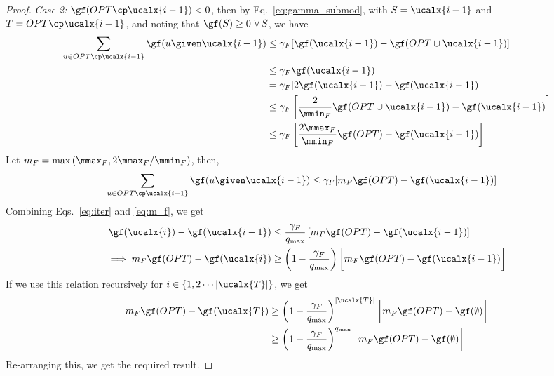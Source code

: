 \begin{proof}
\emph{Case 2:} $\gf(OPT\cp \ucalx{i-1}) < 0$, then by Eq.~\eqref{eq:gamma_submod}, with $S=\ucalx{i-1}$ and $T = OPT\cp \ucalx{i-1}$, and noting that $\gf(S)\ge 0\ \forall\,  S$, we have
\begin{align}
    \sum_{u\in OPT\cp \ucalx{i-1}} \gf(u\given    \ucalx{i-1}) &\le \gamma_F[\gf(\ucalx{i-1}) - \gf(OPT \cup \ucalx{i-1})] \\
                                                    &\le \gamma_F \gf(\ucalx{i-1})\\
                                                    &= \gamma_F [2\gf(\ucalx{i-1}) - \gf(\ucalx{i-1})]\\
                                                    &\le \gamma_F \left[ \frac{2}{\mmin_F} \gf(OPT \cup \ucalx{i-1}) - \gf(\ucalx{i-1})\right]\\
                                                    &\le \gamma_F \left[ \frac{2\mmax_F}{\mmin_F} \gf(OPT) - \gf(\ucalx{i-1})\right]
\end{align}
Let $m_F=\max\left(\mmax_F, 2\mmax_F/\mmin_F \right)$, then,
\begin{align}
    \sum_{u\in OPT\cp \ucalx{i-1}} \gf(u\given    \ucalx{i-1}) &\le \gamma_F[m_F \gf(OPT) - \gf(\ucalx{i-1})]
    \label{eq:m_f}
\end{align}
Combining Eqs.~\eqref{eq:iter} and \eqref{eq:m_f}, we get
\begin{align}
    \gf(\ucalx{i}) - \gf(\ucalx{i-1}) &\le \frac{\gamma_F}{q_{\max}} \left[ m_F \gf(OPT) - \gf(\ucalx{i-1})\right]\\
    \implies  m_F \gf(OPT) - \gf(\ucalx{i}) &\ge \left( 1 - \frac{\gamma_F}{q_{\max}} \right) \bigg[m_F \gf(OPT) - \gf(\ucalx{i-1})\bigg]
\end{align}
If we use this relation recursively for $  i \in \{1,2 \cdots | \ucalx{T}|\}$, we get
\begin{align}
    m_F \gf(OPT) - \gf( \ucalx{T}) &\ge \left( 1 - \frac{\gamma_F}{q_{\max}} \right)^{| \ucalx{T}|} \bigg[m_F \gf(OPT) - \gf(\emptyset)\bigg]\\
    &\ge \left( 1 - \frac{\gamma_F}{q_{\max}} \right)^{q_{\max}} \bigg[m_F \gf(OPT) - \gf(\emptyset)\bigg]
\end{align}
Re-arranging this, we get the required result.
\end{proof}